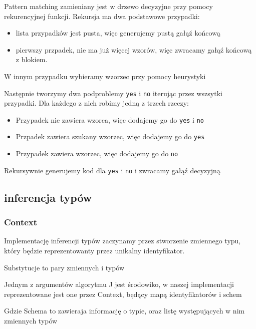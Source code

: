 \documentclass{article}
\begin{document}
Pattern matching zamieniany jest w drzewo decyzyjne przy pomocy rekurencyjnej funkcji.
Rekursja ma dwa podstawowe przypadki:
\begin{itemize}
  \item lista przypadków jest pusta, więc generujemy pustą gałąź końcową
  \item pierwszy przpadek, nie ma już więcej wzorów, więc zwracamy gałąź końcową z blokiem.
\end{itemize}

W innym przypadku wybieramy wzorzec przy pomocy heurystyki\newpage


Następnie tworzymy dwa podproblemy \lstinline{yes} i \lstinline{no} iterując przez wszsytki przypadki. Dla każdego z nich robimy jedną z trzech rzeczy:
\begin{itemize}
  \item Przypadek nie zawiera wzorca, więc dodajemy go do \lstinline{yes} i \lstinline{no}
        
  \item Przpadek zawiera szukany wzorzec, więc dodajemy go do \lstinline{yes}
        
  \item Przypadek zawiera wzorzec, więc dodajemy go do \lstinline{no}
        
\end{itemize}

Rekursywnie generujemy kod dla \lstinline{yes} i \lstinline{no} i zwracamy gałąź decyzyjną

\subsection{inferencja typów}
\subsubsection{Context}
Implementację inferencji typów zaczynamy przez stworzenie zmiennego typu, który będzie reprezentowanty przez unikalny identyfikator.

Substytucje to pary zmiennych i typów

Jednym z argumentów algorytmu J jest środowiko, w naszej implementacji reprezentowane jest one przez Context, będący mapą identyfikatorów i schem

Gdzie Schema to zawieraja informację o typie, oraz listę występujących w nim zmiennych typów

\end{document}
